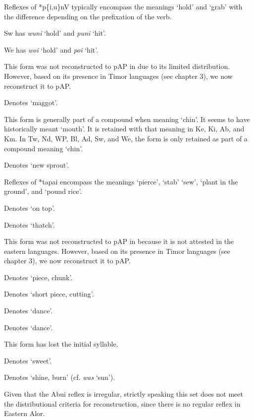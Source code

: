 {\tablenotetext}{Reflexes of *p\{i,u\}nV typically encompass the meanings `hold' and `grab' with the difference depending on the prefixation of the verb.}

{\tablenotetext}{Sw has \textit{wuni} `hold' and \textit{puni }`hit'.}

{\tablenotetext}{We has \textit{woi}\textit{{\ng}} `hold' and \textit{poi}\textit{{\ng}} `hit'.}

{\tablenotetext}{This form was not reconstructed to pAP in \citep{HoltonEtAl2012} due to its limited distribution. However, based on its presence in Timor languages (see chapter 3), we now reconstruct it to pAP.}

{\tablenotetext}{Denotes `maggot'.}

{\tablenotetext}{This form is generally part of a compound when meaning `chin'. It seems to have historically meant `mouth'. It is retained with that meaning in Ke, Ki, Ab, and Km. In Tw, Nd, WP, Bl, Ad, Sw, and We, the form is only retained as part of a compound meaning `chin'.}

{\tablenotetext}{Denotes `new sprout'.}

{\tablenotetext}{Reflexes of *tapai encompass the meanings `pierce', `stab' `sew', `plant in the ground', and `pound rice'. }

{\tablenotetext}{Denotes `on top'.}

{\tablenotetext}{Denotes `thatch'.}

{\tablenotetext}{This form was not reconstructed to pAP in \citep{HoltonEtAl2012} because it is not attested in the eastern languages. However, based on its presence in Timor languages (see chapter 3), we now reconstruct it to pAP.}

{\tablenotetext}{Denotes `piece, chunk'.}

{\tablenotetext}{Denotes `short piece, cutting'.}

{\tablenotetext}{Denotes `dance'.}

{\tablenotetext}{Denotes `dance'.}

{\tablenotetext}{This form has lost the initial syllable. }

{\tablenotetext}{Denotes `sweet'.}

{\tablenotetext}{Denotes `shine, burn' (cf. \textit{was }`sun').}

{\tablenotetext}{Given that the Abui reflex is irregular, strictly speaking this set does not meet the distributional criteria for reconstruction, since there is no regular reflex in Eastern Alor. }

